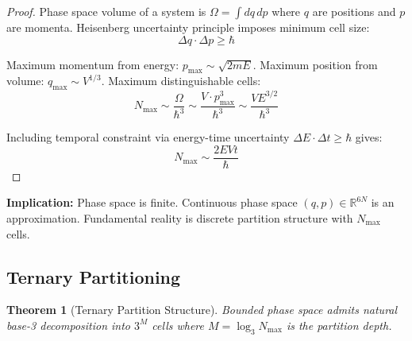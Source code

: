\documentclass[twocolumn,10pt]{article}
\newtheorem{theorem}{Theorem}[section]
\theoremstyle{definition}
\theoremstyle{remark}
\begin{document}
\begin{proof}
Phase space volume of a system is $\Omega = \int dq \, dp$ where $q$ are positions and $p$ are momenta. Heisenberg uncertainty principle imposes minimum cell size:
\begin{equation}
\Delta q \cdot \Delta p \geq \hbar
\end{equation}

Maximum momentum from energy: $p_{\max} \sim \sqrt{2mE}$. Maximum position from volume: $q_{\max} \sim V^{1/3}$. Maximum distinguishable cells:
\begin{equation}
N_{\max} \sim \frac{\Omega}{\hbar^3} \sim \frac{V \cdot p_{\max}^3}{\hbar^3} \sim \frac{VE^{3/2}}{\hbar^3}
\end{equation}

Including temporal constraint via energy-time uncertainty $\Delta E \cdot \Delta t \geq \hbar$ gives:
\begin{equation}
N_{\max} \sim \frac{2EVt}{\hbar}
\end{equation}
\end{proof}

\vspace{0.2cm}
\noindent\textbf{Implication:} Phase space is finite. Continuous phase space $(q,p) \in \mathbb{R}^{6N}$ is an approximation. Fundamental reality is discrete partition structure with $N_{\max}$ cells.

\subsection{Ternary Partitioning}

\begin{theorem}[Ternary Partition Structure]
\label{thm:ternary}
Bounded phase space admits natural base-3 decomposition into $3^M$ cells where $M = \log_3 N_{\max}$ is the partition depth.
\end{theorem}
\end{document}
